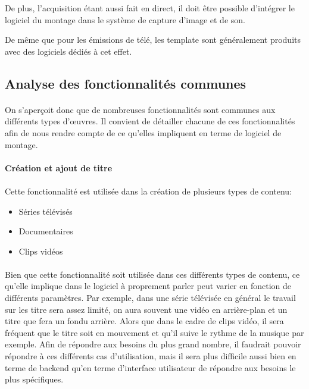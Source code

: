De plus, l'acquisition étant aussi fait en direct, il doit être possible
d'intégrer le logiciel du montage dans le système de capture d'image
et de son.

De même que pour les émissions de télé, les template sont
généralement produits avec des logiciels dédiés à cet effet.

\subsection{Analyse des fonctionnalités communes}

\paragraph{}

On s'aperçoit donc que de nombreuses fonctionnalités sont communes aux
différents types d'œuvres. Il convient de détailler chacune de ces
fonctionnalités afin de nous rendre compte de ce qu'elles impliquent
en terme de logiciel de montage.

\paragraph{Création et ajout de titre}

\paragraph{}

Cette fonctionnalité est utilisée dans la création de plusieurs types
de contenu: \begin{itemize} \setlength{\itemsep}{2mm}
  \item {Séries télévisés} \item {Documentaires} \item {Clips vidéos}
\end{itemize}

\paragraph{}

Bien que cette fonctionnalité soit utilisée dans ces différents
types de contenu, ce qu'elle implique dans le logiciel à proprement
parler peut varier en fonction de différents paramètres. Par exemple,
dans une série télévisée en général le travail sur les titre sera
assez limité, on aura souvent une vidéo en arrière-plan et un titre que
fera un fondu arrière. Alors que dans le cadre de clips vidéo, il sera
fréquent que le titre soit en mouvement et qu'il suive le rythme de la
musique par exemple. Afin de répondre aux besoins du plus grand nombre,
il faudrait pouvoir répondre à ces différents cas d'utilisation,
mais il sera plus difficile aussi bien en terme de backend qu'en terme
d'interface utilisateur de répondre aux besoins le plus spécifiques.

